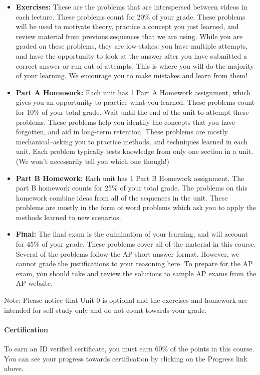 \documentclass[pdftex, brazil, 12pt, twoside]{article}
\begin{document}
\begin{itemize}
\item \textbf{Exercises:} These are the problems that are interspersed between videos in each lecture. These problems count for 20\% of your grade. These problems will be used to motivate theory, practice a concept you just learned, and review material from previous sequences that we are using. While you are graded on these problems, they are low-stakes: you have multiple attempts, and have the opportunity to look at the answer after you have submitted a correct answer or run out of attempts. This is where you will do the majority of your learning. We encourage you to make mistakes and learn from them!
\item \textbf{Part A Homework:} Each unit has 1 Part A Homework assignment, which gives you an opportunity to practice what you learned. These problems count for 10\% of your total grade. Wait until the end of the unit to attempt these problems. These problems help you identify the concepts that you have forgotten, and aid in long-term retention. These problems are mostly mechanical–asking you to practice methods, and techniques learned in each unit. Each problem typically tests knowledge from only one section in a unit. (We won't necessarily tell you which one though!)
\item \textbf{Part B Homework:} Each unit has 1 Part B Homework assignment. The part B homework counts for 25\% of your total grade. The problems on this homework combine ideas from all of the sequences in the unit. These problems are mostly in the form of word problems which ask you to apply the methods learned to new scenarios.
\item \textbf{Final:} The final exam is the culmination of your learning, and will account for 45\% of your grade. These problems cover all of the material in this course. Several of the problems follow the AP short-answer format. However, we cannot grade the justifications to your reasoning here. To prepare for the AP exam, you should take and review the solutions to sample AP exams from the AP website. 
\end{itemize}

Note: Please notice that Unit 0 is optional and the exercises and homework are intended for self study only and do not count towards your grade.

\paragraph{Certification} To earn an ID verified certificate, you must earn 60\% of the points in this course. You can see your progress towards certification by clicking on the Progress link above.
\end{document}
